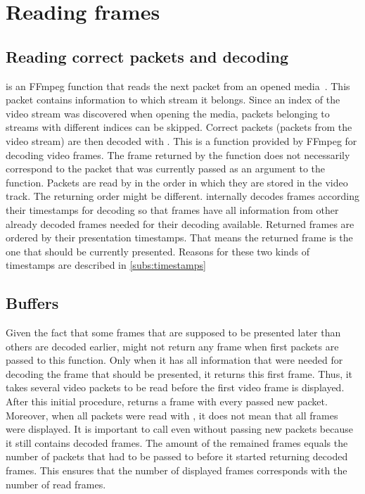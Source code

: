 \section{Reading frames}\label{sec:reading}
\subsection{Reading correct packets and decoding}\label{subs:decoding}
 is an FFmpeg function that reads the next packet from an opened media~\cite{ffmpeg_dranger}. This packet contains information to which stream it belongs. Since an index of the video stream was discovered when opening the media, packets belonging to streams with different indices can be skipped. Correct packets (packets from the video stream) are then decoded with . This is a function provided by FFmpeg for decoding video frames. The frame returned by the function does not necessarily correspond to the packet that was currently passed as an argument to the function. Packets are read by  in the order in which they are stored in the video track. The returning order might be different.  internally decodes frames according their timestamps for decoding so that frames have all information from other already decoded frames needed for their decoding available. Returned frames are ordered by their presentation timestamps. That means the returned frame is the one that should be currently presented. Reasons for these two kinds of timestamps are described in \autoref{subs:timestamps}

\subsection{Buffers}
Given the fact that some frames that are supposed to be presented later than others are decoded earlier,  might not return any frame when first packets are passed to this function. Only when it has all information that were needed for decoding the frame that should be presented, it returns this first frame. Thus, it takes several video packets to be read before the first video frame is displayed. After this initial procedure,  returns a frame with every passed new packet.
Moreover, when all packets were read with , it does not mean that all frames were displayed. It is important to call  even without passing new packets because it still contains decoded frames. The amount of the remained frames equals the number of packets that had to be passed to  before it started returning decoded frames. This ensures that the number of displayed frames corresponds with the number of read frames.

